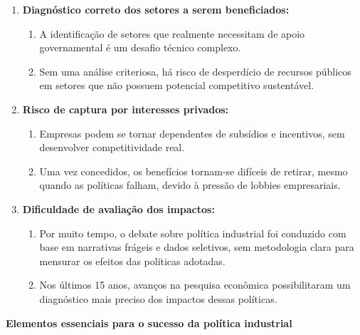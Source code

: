 \documentclass[a4paper,12pt]{article}[abntex2]
\begin{document}
\begin{enumerate}
    \item \textbf{Diagnóstico correto dos setores a serem beneficiados:}  
    \begin{enumerate}
        \item A identificação de setores que realmente necessitam de apoio governamental é um desafio técnico complexo.
        \item Sem uma análise criteriosa, há risco de desperdício de recursos públicos em setores que não possuem potencial competitivo sustentável.
    \end{enumerate}

    \item \textbf{Risco de captura por interesses privados:}  
    \begin{enumerate}
        \item Empresas podem se tornar dependentes de subsídios e incentivos, sem desenvolver competitividade real.
        \item Uma vez concedidos, os benefícios tornam-se difíceis de retirar, mesmo quando as políticas falham, devido à pressão de lobbies empresariais.
    \end{enumerate}

    \item \textbf{Dificuldade de avaliação dos impactos:}  
    \begin{enumerate}
        \item Por muito tempo, o debate sobre política industrial foi conduzido com base em narrativas frágeis e dados seletivos, sem metodologia clara para mensurar os efeitos das políticas adotadas.
        \item Nos últimos 15 anos, avanços na pesquisa econômica possibilitaram um diagnóstico mais preciso dos impactos dessas políticas.
    \end{enumerate}
\end{enumerate}

\textbf{Elementos essenciais para o sucesso da política industrial}
\end{document}
